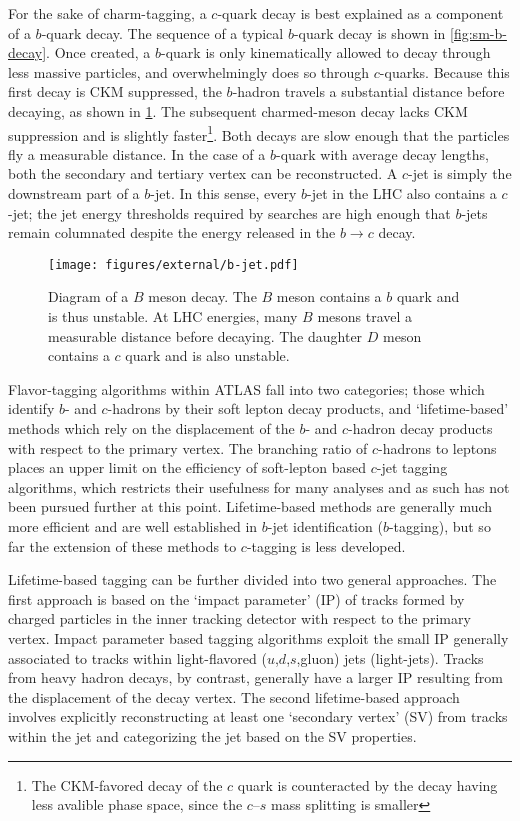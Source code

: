 For the sake of charm-tagging, a $c$-quark decay is best explained as a component of a $b$-quark decay.
The sequence of a typical $b$-quark decay is shown in \cref{fig:sm-b-decay}.
Once created, a $b$-quark is only kinematically allowed to decay through less massive particles, and overwhelmingly does so through $c$-quarks.
Because this first decay is CKM suppressed, the $b$-hadron travels a substantial distance before decaying, as shown in \cref{fig:b-jet}.
The subsequent charmed-meson decay lacks CKM suppression and is slightly faster\footnote{The CKM-favored decay of the $c$ quark is counteracted by the decay having less avalible phase space, since the $c$--$s$ mass splitting is smaller}.
Both decays are slow enough that the particles fly a measurable distance.
In the case of a $b$-quark with average decay lengths, both the secondary and tertiary vertex can be reconstructed.
A $c$-jet is simply the downstream part of a $b$-jet.
In this sense, every $b$-jet in the LHC also contains a $c$-jet; the jet energy thresholds required by searches are high enough that $b$-jets remain columnated despite the energy released in the $b \to c$ decay.

\begin{figure}
  \begin{center}
    \texttt{[image: figures/external/b-jet.pdf]}
    \caption[Diagram of a $B$-meson decay.]{Diagram of a $B$ meson decay. The $B$ meson contains a $b$ quark and is thus unstable. At LHC energies, many $B$ mesons travel a measurable distance before decaying. The daughter $D$ meson contains a $c$ quark and is also unstable.}
    \label{fig:b-jet}
  \end{center}
\end{figure}

Flavor-tagging algorithms within ATLAS fall into two categories; those which identify $b$- and $c$-hadrons by their soft lepton decay products, and `lifetime-based' methods which rely on the displacement of the $b$- and $c$-hadron decay products with respect to the primary vertex.
The branching ratio of $c$-hadrons to leptons places an upper limit on the efficiency of soft-lepton based $c$-jet tagging algorithms, which restricts their usefulness for many analyses and as such has not been pursued further at this point.
Lifetime-based methods are generally much more efficient and are well established in $b$-jet identification ($b$-tagging), but so far the extension of these methods to $c$-tagging is less developed.

Lifetime-based tagging can be further divided into two general approaches. The first approach is based on the `impact parameter' (IP) of tracks formed by charged particles in the inner tracking detector with respect to the primary vertex. Impact parameter based tagging algorithms exploit the small IP generally associated to tracks within light-flavored ($u$,$d$,$s$,gluon) jets (light-jets). Tracks from heavy hadron decays, by contrast, generally have a larger IP resulting from the displacement of the decay vertex. The second lifetime-based approach involves explicitly reconstructing at least one `secondary vertex' (SV) from tracks within the jet and categorizing the jet based on the SV properties.

